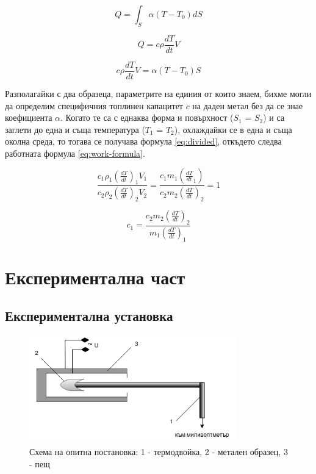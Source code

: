 \documentclass[12pt]{article}
\begin{document}
\begin{equation}\label{eq:q-unit-surface}
    Q = \int_S \alpha(T - T_0)dS
\end{equation}

\begin{equation}\label{eq:q-volume}
    Q = c \rho \frac{dT}{dt}V
\end{equation}

\begin{equation}\label{eq:1-to-3}
    c \rho \frac{dT}{dt}V = \alpha(T - T_0)S
\end{equation}

Разполагайки с два образеца, параметрите на единия от които знаем, бихме могли да определим специфичния топлинен капацитет $c$ на даден метал без да се знае коефициента $\alpha$. Когато те са с еднаква форма и повърхност ($S_1$ = $S_2$) и са заглети до една и съща температура ($T_1$ = $T_2$), охлаждайки се в една и съща околна среда, то тогава се получава формула \ref{eq:divided}, откъдето следва работната формула \ref{eq:work-formula}.

\begin{equation}\label{eq:divided}
    \frac{c_1\rho_1(\frac{dT}{dt})_1V_1}{c_2\rho_2(\frac{dT}{dt})_2V_2} = \frac{c_1m_1(\frac{dT}{dt}_1)}{c_2m_2(\frac{dT}{dt})_2} = 1    
\end{equation}

\begin{equation}\label{eq:work-formula}
    c_1 = \frac{c_2m_2(\frac{dT}{dt})_2}{m_1(\frac{dT}{dt})_1}
\end{equation}


\section{Експериментална част}

\subsection{Експериментална установка}
\begin{figure}
    \centering
    \includegraphics[width=0.8\textwidth]{images/setup.png}
    \caption{Схема на опитна постановка: 1 - термодвойка, 2 - метален образец, 3 - пещ}
    \label{fig:setup}
\end{figure} 
\end{document}
